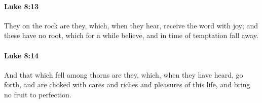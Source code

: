 		\paragraph{Luke 8:13} %
			\label{LUKE-8-13}

			They on the rock are they, which, when they hear, receive the word with joy; and these have no root, which for a while believe, and in time of temptation fall away.

			\begin{framed}
			\scriptsize
				\begin{compactdesc}
					\item[SBLG] 
				\end{compactdesc}
			\end{framed}

		\paragraph{Luke 8:14} %
			\label{LUKE-8-14}

			And that which fell among thorns are they, which, when they have heard, go forth, and are choked with cares and riches and pleasures of this life, and bring no fruit to perfection.

